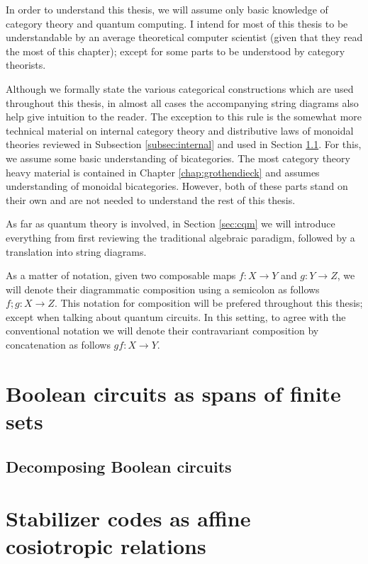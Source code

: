 \documentclass[12pt]{ociamthesis}  %
\begin{document}
\label{chap:background}
In order to understand this thesis, we will assume only basic knowledge of category theory and quantum computing.  I intend for most of this thesis to be understandable by an average theoretical computer scientist  (given that they read the most of this chapter); except for some parts to be understood by category theorists.


Although we formally state the various categorical constructions which are used throughout this thesis, in almost all cases the accompanying string diagrams also help give intuition to the reader.  The exception to this rule is the somewhat more technical  material on internal category theory and distributive laws of monoidal theories reviewed in Subsection \ref{subsec:internal} and used in Section \ref{sec:dist}.  For this, we assume some basic understanding of bicategories.  The most category theory heavy material is contained in Chapter \ref{chap:grothendieck} and assumes understanding of monoidal bicategories.  However, both of these parts stand on their own and are not needed to understand the rest of this thesis.

As far as quantum theory is involved, in Section \ref{sec:cqm} we will introduce everything from first reviewing the traditional algebraic paradigm, followed by a translation into string diagrams.

As a matter of notation, given two composable maps $f:X\to Y$ and $g:Y \to Z$, we will denote their diagrammatic composition using a semicolon as follows $f;g:X\to Z$. This notation for composition will be prefered throughout this thesis; except when talking about quantum circuits.  In this setting, to agree with the conventional notation we will denote their contravariant composition by concatenation as follows $gf:X\to Y$.





\chapter{Boolean circuits as spans of finite sets}
\label{chap:zxa}


\section{Decomposing Boolean circuits}
\label{sec:dist}


\chapter{Stabilizer codes as affine cosiotropic relations}
\label{chap:stab}

\end{document}
